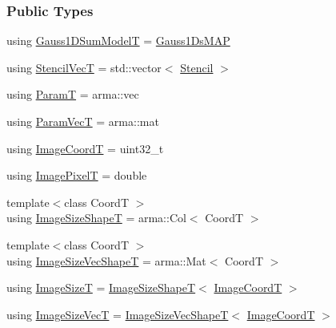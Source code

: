 \subsubsection*{Public Types}
\begin{DoxyCompactItemize}
\item 
using \hyperlink{classmappel_1_1Gauss2DsModel_a23ae68443a62f76405e6f08f6dec4fb7}{Gauss1\+D\+Sum\+ModelT} = \hyperlink{classmappel_1_1Gauss1DsMAP}{Gauss1\+Ds\+M\+AP}
\item 
using \hyperlink{classmappel_1_1Gauss2DsModel_ad4e1cca4ec2258c99fe7ca32fff3517a}{Stencil\+VecT} = std\+::vector$<$ \hyperlink{classmappel_1_1Gauss2DsModel_1_1Stencil}{Stencil} $>$
\item 
using \hyperlink{classmappel_1_1PointEmitterModel_a665ec6aea3aac139bb69a23c06d4b9a1}{ParamT} = arma\+::vec
\item 
using \hyperlink{classmappel_1_1PointEmitterModel_add253b568d763f1513a810aac35de719}{Param\+VecT} = arma\+::mat
\item 
using \hyperlink{classmappel_1_1ImageFormat2DBase_a45e9234d63c357f34ca56c72c12b9e9c}{Image\+CoordT} = uint32\+\_\+t
\item 
using \hyperlink{classmappel_1_1ImageFormat2DBase_af6bae6f78398ab1eacb39726a05adeef}{Image\+PixelT} = double
\item 
{\footnotesize template$<$class CoordT $>$ }\\using \hyperlink{classmappel_1_1ImageFormat2DBase_a23c1a9e9f1482852aa0cf4951efe7c48}{Image\+Size\+ShapeT} = arma\+::\+Col$<$ CoordT $>$
\item 
{\footnotesize template$<$class CoordT $>$ }\\using \hyperlink{classmappel_1_1ImageFormat2DBase_afe9ededf04942330121003e3dd8f9311}{Image\+Size\+Vec\+ShapeT} = arma\+::\+Mat$<$ CoordT $>$
\item 
using \hyperlink{classmappel_1_1ImageFormat2DBase_a49cccf61eb2a768a202634d27fcd81d5}{Image\+SizeT} = \hyperlink{classmappel_1_1ImageFormat2DBase_a23c1a9e9f1482852aa0cf4951efe7c48}{Image\+Size\+ShapeT}$<$ \hyperlink{classmappel_1_1ImageFormat2DBase_a45e9234d63c357f34ca56c72c12b9e9c}{Image\+CoordT} $>$
\item 
using \hyperlink{classmappel_1_1ImageFormat2DBase_aa88536c52195a927cf32558856f05a13}{Image\+Size\+VecT} = \hyperlink{classmappel_1_1ImageFormat2DBase_afe9ededf04942330121003e3dd8f9311}{Image\+Size\+Vec\+ShapeT}$<$ \hyperlink{classmappel_1_1ImageFormat2DBase_a45e9234d63c357f34ca56c72c12b9e9c}{Image\+CoordT} $>$
\item 

\end{DoxyCompactItemize}
